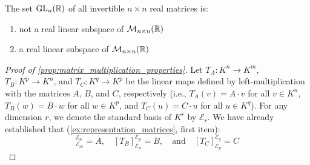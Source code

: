 \begin{exercise}
\label{exc:gl_not_subspace_sc}
The set $\operatorname{GL}_n(\mathbb{R})$ of all invertible $n \times n$ real matrices is:
\begin{enumerate}
    \item not a real linear subspace of $\mathcal{M}_{n \times n}(\mathbb{R})$
    \item a real linear subspace of $\mathcal{M}_{n \times n}(\mathbb{R})$
\end{enumerate}
\end{exercise}

\begin{proof}[Proof of \cref{prop:matrix_multiplication_properties}]
Let $T_A: K^n \to K^m$, $T_B: K^p \to K^n$, and $T_C: K^q \to K^p$ be the linear maps defined by left-multiplication with the matrices $A$, $B$, and $C$, respectively (i.e., $T_A(v) = A \cdot v$ for all $v \in K^n$, $T_B(w) = B \cdot w$ for all $w \in K^p$, and $T_C(u) = C \cdot u$ for all $u \in K^q$). For any dimension $r$, we denote the standard basis of $K^r$ by $\mathcal{E}_r$. We have already established that (\cref{ex:representation_matrices}, first item):
\begin{equation*}
    [T_A]_{\mathcal{E}_m}^{\mathcal{E}_n} = A, \quad [T_B]_{\mathcal{E}_n}^{\mathcal{E}_p} = B, \quad \text{and} \quad [T_C]_{\mathcal{E}_p}^{\mathcal{E}_q} = C
\end{equation*}


\end{proof}
